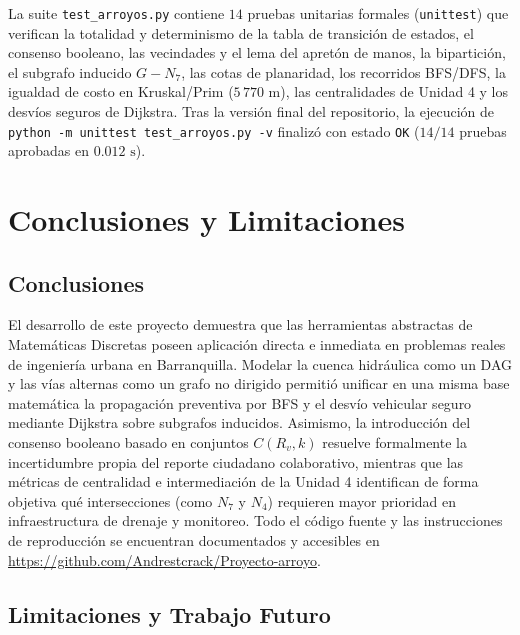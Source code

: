 \documentclass[12pt,letterpaper]{article}
\begin{document}
La suite \texttt{test\_arroyos.py} contiene $14$ pruebas unitarias formales (\texttt{unittest}) que verifican la totalidad y determinismo de la tabla de transición de estados, el consenso booleano, las vecindades y el lema del apretón de manos, la bipartición, el subgrafo inducido $G - N_7$, las cotas de planaridad, los recorridos BFS/DFS, la igualdad de costo en Kruskal/Prim ($5\,770\text{ m}$), las centralidades de Unidad 4 y los desvíos seguros de Dijkstra. Tras la versión final del repositorio, la ejecución de \texttt{python -m unittest test\_arroyos.py -v} finalizó con estado \texttt{OK} ($14/14$ pruebas aprobadas en $0.012\text{ s}$).

\section{Conclusiones y Limitaciones}

\subsection{Conclusiones}

El desarrollo de este proyecto demuestra que las herramientas abstractas de Matemáticas Discretas poseen aplicación directa e inmediata en problemas reales de ingeniería urbana en Barranquilla. Modelar la cuenca hidráulica como un DAG y las vías alternas como un grafo no dirigido permitió unificar en una misma base matemática la propagación preventiva por BFS y el desvío vehicular seguro mediante Dijkstra sobre subgrafos inducidos. Asimismo, la introducción del consenso booleano basado en conjuntos $C(R_v, k)$ resuelve formalmente la incertidumbre propia del reporte ciudadano colaborativo, mientras que las métricas de centralidad e intermediación de la Unidad 4 identifican de forma objetiva qué intersecciones (como $N_7$ y $N_4$) requieren mayor prioridad en infraestructura de drenaje y monitoreo. Todo el código fuente y las instrucciones de reproducción se encuentran documentados y accesibles en \url{https://github.com/Andrestcrack/Proyecto-arroyo}.

\subsection{Limitaciones y Trabajo Futuro}
\end{document}
